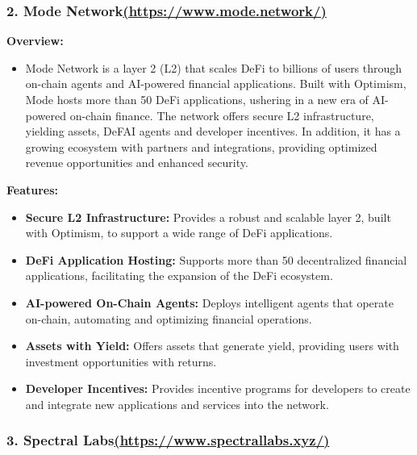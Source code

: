 \documentclass[
]{article}
\providecommand{\tightlist}{%
  \setlength{\itemsep}{0pt}\setlength{\parskip}{0pt}}
\begin{document}
\hypertarget{mode-networkhttpswww.mode.network}{%
\subsubsection{\texorpdfstring{2. Mode
Network\href{https://www.mode.network/}{(https://www.mode.network/)}}{2. Mode Network(https://www.mode.network/)}}\label{mode-networkhttpswww.mode.network}}

\textbf{Overview:}

\begin{itemize}
\tightlist
\item
  Mode Network is a layer 2 (L2) that scales DeFi to billions of users
  through on-chain agents and AI-powered financial applications. Built
  with Optimism, Mode hosts more than 50 DeFi applications, ushering in
  a new era of AI-powered on-chain finance. The network offers secure L2
  infrastructure, yielding assets, DeFAI agents and developer
  incentives. In addition, it has a growing ecosystem with partners and
  integrations, providing optimized revenue opportunities and enhanced
  security.
\end{itemize}

\textbf{Features:}

\begin{itemize}
\tightlist
\item
  \textbf{Secure L2 Infrastructure:} Provides a robust and scalable
  layer 2, built with Optimism, to support a wide range of DeFi
  applications.
\item
  \textbf{DeFi Application Hosting:} Supports more than 50 decentralized
  financial applications, facilitating the expansion of the DeFi
  ecosystem.
\item
  \textbf{AI-powered On-Chain Agents:} Deploys intelligent agents that
  operate on-chain, automating and optimizing financial operations.
\item
  \textbf{Assets with Yield:} Offers assets that generate yield,
  providing users with investment opportunities with returns.
\item
  \textbf{Developer Incentives:} Provides incentive programs for
  developers to create and integrate new applications and services into
  the network.
\end{itemize}

\hypertarget{spectral-labshttpswww.spectrallabs.xyz}{%
\subsubsection{\texorpdfstring{3. Spectral
Labs\href{https://www.spectrallabs.xyz/}{(https://www.spectrallabs.xyz/)}}{3. Spectral Labs(https://www.spectrallabs.xyz/)}}\label{spectral-labshttpswww.spectrallabs.xyz}}
\end{document}
